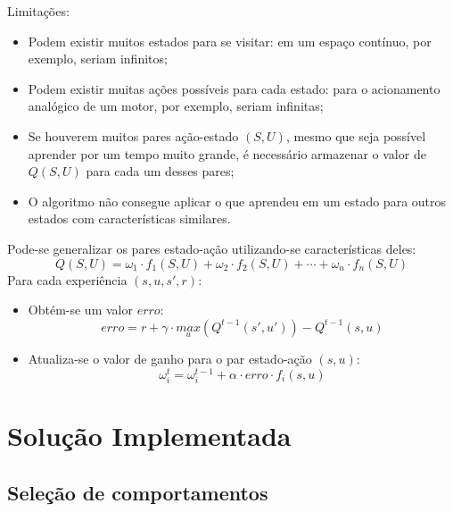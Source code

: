 \documentclass{beamer}
\begin{document}
\begin{frame}
Limitações:\pause
\begin{itemize}
	\item Podem existir muitos estados para se visitar: em um espaço contínuo, por exemplo, seriam infinitos;\pause
	\item Podem existir muitas ações possíveis para cada estado: para o acionamento analógico de um motor, por exemplo, seriam infinitas;\pause
	\item Se houverem muitos pares ação-estado $ \left( S, U \right) $, mesmo que seja possível aprender por um tempo muito grande, é necessário armazenar o valor de $ Q \left( S, U \right) $ para cada um desses pares;\pause
	\item O algoritmo não consegue aplicar o que aprendeu em um estado para outros estados com características similares.
\end{itemize}
\end{frame}


\begin{frame}
Pode-se generalizar os pares estado-ação utilizando-se características deles:
$$ Q \left( S, U \right) = \omega_1 \cdot f_1 \left( S, U \right) + \omega_2 \cdot f_2 \left( S, U \right) + \cdots + \omega_n \cdot f_n \left( S, U \right) $$\pause
Para cada experiência $ \left( s, u, s', r \right) $:\pause
\begin{itemize}
	\item Obtém-se um valor $ erro $:
		$$ erro = r + \gamma \cdot \underset{u}{max} \left( Q^{t-1} \left( s', u' \right) \right) - Q^{t-1} \left( s, u \right) $$\pause
	\item Atualiza-se o valor de ganho para o par estado-ação $ \left( s, u \right) $:
		$$ \omega_i^t = \omega_i^{t-1} + \alpha \cdot erro \cdot f_i \left( s, u \right) $$
\end{itemize}
\end{frame}

\section{Solução Implementada}

\subsection{Seleção de comportamentos}
\end{document}
